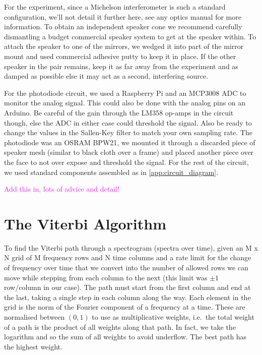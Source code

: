 \documentclass[prb,preprint]{revtex4-1}
\newcommand{\jam}{\textcolor{magenta}}
\begin{document}
For the experiment, since a Michelson interferometer is such a standard configuration, we’ll not detail it further here, see any optics manual for more information. To obtain an independent speaker cone we recommend carefully dismantling a budget commercial speaker system to get at the speaker within. To attach the speaker to one of the mirrors, we wedged it into part of the mirror mount and used commercial adhesive putty to keep it in place. If the other speaker in the pair remains, keep it as far away from the experiment and as damped as possible else it may act as a second, interfering source.

For the photodiode circuit, we used a Raspberry Pi and an MCP3008 ADC to monitor the analog signal. This could also be done with the analog pins on an Arduino. Be careful of the gain through the LM358 op-amps in the circuit though, else the ADC in either case could threshold the signal. Also be ready to change the values in the Sallen-Key filter to match your own sampling rate. The photodiode was an OSRAM BPW21, we mounted it through a discarded piece of speaker mesh (similar to black cloth over a frame) and placed another piece over the face to not over expose and threshold the signal. For the rest of the circuit, we used standard components assembled as in \ref{app:circuit_diagram}.

\jam{Add this in, lots of advice and detail!}


\section{The Viterbi Algorithm}
\label{app:viterbi}

To find the Viterbi path through a spectrogram (spectra over time), given an M x N grid of M frequency rows and N time columns and a rate limit for the change of frequency over time that we convert into the number of allowed rows we can move while stepping from each column to the next (this limit was $\pm 1$ row/column in our case). The path must start from the first column and end at the last, taking a single step in each column along the way. Each element in the grid is the norm of the Fourier component of a frequency at a time. These are normalised between $(0, 1)$ to use as multiplicative weights, i.e.\ the total weight of a path is the product of all weights along that path. In fact, we take the logarithm and so the sum of all weights to avoid underflow. The best path has the highest weight.
\end{document}
